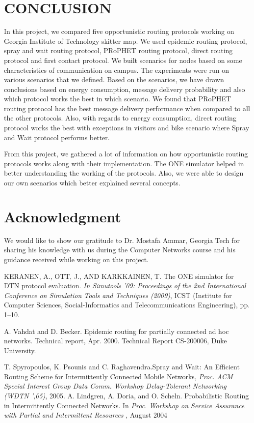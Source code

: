 \documentclass[conference]{IEEEtran}
\begin{document}
\section{CONCLUSION}
In this project, we compared five opportunistic routing protocols working on Georgia Institute of Technology skitter map. We used epidemic routing protocol, spray and wait routing protocol, PRoPHET routing protocol, direct routing protocol and first contact protocol. We built scenarios for nodes based on some characteristics of communication on campus. The experiments were run on various scenarios that we defined. Based on the scenarios, we have drawn conclusions based on energy consumption, message delivery probability and also which protocol works the best in which scenario. We found that PRoPHET routing protocol has the best message delivery performance when compared to all the other protocols. Also, with regards to energy consumption, direct routing protocol works the best with exceptions in visitors and bike scenario where Spray and Wait protocol performs better. 

From this project, we gathered a lot of information on how opportunistic routing protocols works along with their implementation. The ONE simulator helped in better understanding the working of the protocols. Also, we were able to design our own scenarios which better explained several concepts.  


\section*{Acknowledgment}

We would like to show our gratitude to Dr. Mostafa Ammar, Georgia Tech for sharing his knowledge with us during the Computer Networks course and his guidance received while working on this project.

\begin{thebibliography}{1}
KERANEN, A., OTT, J., AND KARKKAINEN, T. The ONE simulator for DTN protocol evaluation. \emph{In Simutools ’09: Proceedings of the 2nd International Conference on Simulation Tools and Techniques (2009)}, ICST (Institute for Computer Sciences, Social-Informatics and Telecommunications Engineering), pp. 1–10.

A. Vahdat and D. Becker. Epidemic routing for partially connected ad hoc networks. Technical report, Apr. 2000. Technical Report CS-200006, Duke University. 

T. Spyropoulos, K. Psounis and C. Raghavendra.Spray and Wait: An Efficient Routing Scheme for Intermittently Connected Mobile Networks, \emph{Proc. ACM Special Interest Group Data Comm. Workshop Delay-Tolerant Networking (WDTN ',05)}, 2005. 
A. Lindgren, A. Doria, and O. Scheln.   Probabilistic Routing in Intermittently Connected Networks. In\emph{
Proc. Workshop on Service
Assurance with Partial and Intermittent Resources
}, August 2004
\end{thebibliography}
%
%

\end{document}
